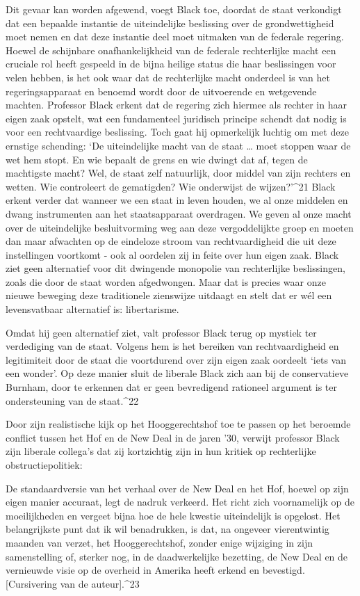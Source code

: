\documentclass[
  a5paper,
  smalldemyvopaper,10pt,twoside,onecolumn,openright,extrafontsizes,hidelinks]{memoir}
\renewenvironment{quote}%
               {\list{}{\rightmargin=.6cm\leftmargin=.6cm}%
                \itshape \item[]}%
               {\endlist}
\begin{document}
Dit gevaar kan worden afgewend, voegt Black toe, doordat de staat
verkondigt dat een bepaalde instantie de uiteindelijke beslissing over
de grondwettigheid moet nemen en dat deze instantie deel moet uitmaken
van de federale regering. Hoewel de schijnbare onafhankelijkheid van de
federale rechterlijke macht een cruciale rol heeft gespeeld in de bijna
heilige status die haar beslissingen voor velen hebben, is het ook waar
dat de rechterlijke macht onderdeel is van het regeringsapparaat en
benoemd wordt door de uitvoerende en wetgevende machten. Professor Black
erkent dat de regering zich hiermee als rechter in haar eigen zaak
opstelt, wat een fundamenteel juridisch principe schendt dat nodig is
voor een rechtvaardige beslissing. Toch gaat hij opmerkelijk luchtig om
met deze ernstige schending: `De uiteindelijke macht van de staat
\ldots{} moet stoppen waar de wet hem stopt. En wie bepaalt de grens en
wie dwingt dat af, tegen de machtigste macht? Wel, de staat zelf
natuurlijk, door middel van zijn rechters en wetten. Wie controleert de
gematigden? Wie onderwijst de wijzen?'\^{}21 Black erkent verder dat
wanneer we een staat in leven houden, we al onze middelen en dwang
instrumenten aan het staatsapparaat overdragen. We geven al onze macht
over de uiteindelijke besluitvorming weg aan deze vergoddelijkte groep
en moeten dan maar afwachten op de eindeloze stroom van rechtvaardigheid
die uit deze instellingen voortkomt - ook al oordelen zij in feite over
hun eigen zaak. Black ziet geen alternatief voor dit dwingende monopolie
van rechterlijke beslissingen, zoals die door de staat worden
afgedwongen. Maar dat is precies waar onze nieuwe beweging deze
traditionele zienswijze uitdaagt en stelt dat er wél een levensvatbaar
alternatief is: libertarisme.

Omdat hij geen alternatief ziet, valt professor Black terug op mystiek
ter verdediging van de staat. Volgens hem is het bereiken van
rechtvaardigheid en legitimiteit door de staat die voortdurend over zijn
eigen zaak oordeelt `iets van een wonder'. Op deze manier sluit de
liberale Black zich aan bij de conservatieve Burnham, door te erkennen
dat er geen bevredigend rationeel argument is ter ondersteuning van de
staat.\^{}22

Door zijn realistische kijk op het Hooggerechtshof toe te passen op het
beroemde conflict tussen het Hof en de New Deal in de jaren '30, verwijt
professor Black zijn liberale collega's dat zij kortzichtig zijn in hun
kritiek op rechterlijke obstructiepolitiek:

\begin{quote}
De standaardversie van het verhaal over de New Deal en het Hof, hoewel
op zijn eigen manier accuraat, legt de nadruk verkeerd. Het richt zich
voornamelijk op de moeilijkheden en vergeet bijna hoe de hele kwestie
uiteindelijk is opgelost. Het belangrijkste punt dat ik wil benadrukken,
is dat, na ongeveer vierentwintig maanden van verzet, het
Hooggerechtshof, zonder enige wijziging in zijn samenstelling of,
sterker nog, in de daadwerkelijke bezetting, de New Deal en de
vernieuwde visie op de overheid in Amerika heeft erkend en bevestigd.
{[}Cursivering van de auteur{]}.\^{}23
\end{quote}
\end{document}
